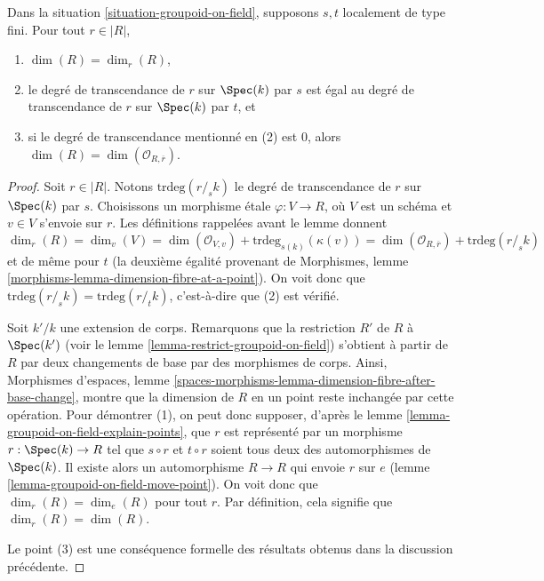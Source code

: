 \begin{lemma}
\label{lemma-groupoid-on-field-locally-finite-type-dimension}
Dans la
situation \ref{situation-groupoid-on-field},
supposons $s, t$ localement de type fini.
Pour tout $r \in |R|$,
\begin{enumerate}
\item $\dim(R) = \dim_r(R)$,
\item le degré de transcendance de $r$ sur $\Spec(k)$
par $s$ est égal au degré de transcendance de $r$ sur $\Spec(k)$
par $t$, et
\item si le degré de transcendance mentionné en (2) est $0$, alors
$\dim(R) = \dim(\mathcal{O}_{R, \overline{r}})$.
\end{enumerate}
\end{lemma}

\begin{proof}
Soit $r \in |R|$. Notons $\text{trdeg}(r/_{\!\! s}k)$ le degré de
transcendance de $r$ sur $\Spec(k)$ par $s$. Choisissons un morphisme étale
$\varphi : V \to R$, où $V$ est un schéma et $v \in V$ s'envoie sur $r$.
Les définitions rappelées avant le lemme donnent
$$
\dim_r(R) = \dim_v(V) =
\dim(\mathcal{O}_{V, v}) + \text{trdeg}_{s(k)}(\kappa(v)) =
\dim(\mathcal{O}_{R, \overline{r}}) + \text{trdeg}(r/_{\!\! s}k)
$$
et de même pour $t$ (la deuxième égalité provenant de
Morphismes, lemme \ref{morphisms-lemma-dimension-fibre-at-a-point}).
On voit donc que $\text{trdeg}(r/_{\!\! s}k) = \text{trdeg}(r/_{\!\! t}k)$,
c'est-à-dire que (2) est vérifié.

\medskip\noindent
Soit $k'/k$ une extension de corps. Remarquons que la restriction $R'$
de $R$ à $\Spec(k')$ (voir le
lemme \ref{lemma-restrict-groupoid-on-field})
s'obtient à partir de $R$ par deux changements de base par des morphismes de corps. Ainsi,
Morphismes d'espaces,
lemme \ref{spaces-morphisms-lemma-dimension-fibre-after-base-change},
montre que la dimension de $R$ en un point reste inchangée par cette opération.
Pour démontrer (1), on peut donc supposer, d'après le
lemme \ref{lemma-groupoid-on-field-explain-points},
que $r$ est représenté par un morphisme $r : \Spec(k) \to R$ tel
que $s \circ r$ et $t \circ r$ soient tous deux des automorphismes de $\Spec(k)$.
Il existe alors un automorphisme $R \to R$ qui envoie $r$ sur $e$
(lemme \ref{lemma-groupoid-on-field-move-point}).
On voit donc que $\dim_r(R) = \dim_e(R)$ pour tout $r$. Par définition, cela
signifie que $\dim_r(R) = \dim(R)$.

\medskip\noindent
Le point (3) est une conséquence formelle des résultats obtenus dans la
discussion précédente.
\end{proof}

